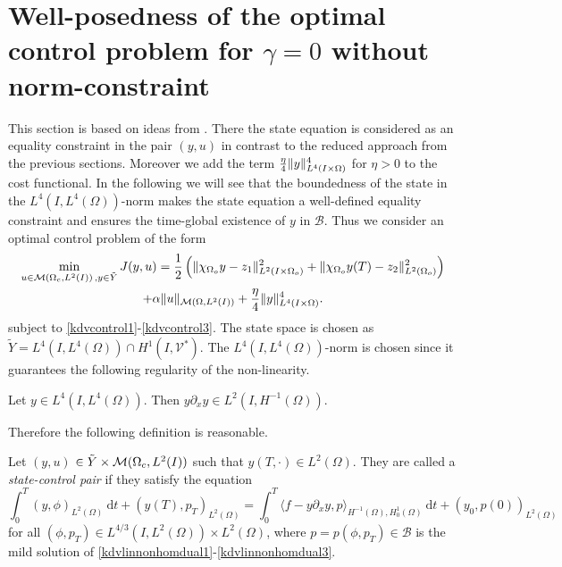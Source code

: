 \section{Well-posedness of the optimal control problem for $\gamma=0$ without norm-constraint}
\label{wp2}
This section is based on ideas from \cite{lions1985control}. There the state equation is considered as an equality constraint in the pair $(y,u)$ in contrast to the reduced approach from the previous sections. Moreover we add the term $\frac{\eta}{4} \lVert y\rVert_{L^4(I\times \Omega)}^4$ for $\eta >0$ to the cost functional. In the following we will see that the boundedness of the state in the $L^4(I,L^4(\Omega))$-norm makes the state equation a well-defined equality constraint and ensures the time-global existence of $y$ in $\mathcal B$. Thus we consider an optimal control problem of the form
\begin{multline}
\min_{u \in \M\,,y\in \tilde Y}J(y,u)=\frac{1}{2}\left(\norm{\chi_{\Omega_{o}}y - z_1}_{L^2(I\times \Omega_{o})}^2+\|\chi_{\Omega_{o}}y(T)-z_2\|_{L^2(\Omega_{o})}^2\right) \\+ \alpha \norm{u}_{\mathcal{M}(\Omega, L^{2}(I))} + \frac{\eta}{4} \norm{y}_{L^4(I\times \Omega)}^4.
\label{cost2}
\end{multline}
subject to \eqref{kdvcontrol1}-\eqref{kdvcontrol3}. The state space is chosen as $\tilde Y = L^4(I,L^4(\Omega))\cap H^1(I,\mathcal V^\ast)$.  The $L^4(I,L^4(\Omega))$-norm is chosen since it guarantees the following regularity of the non-linearity.
\begin{lemma}
\label{lemyyxL4}
 Let $y \in L^4(I,L^4(\Omega))$. Then $y \partial_x y \in L^2(I,H^{-1}(\Omega))$.\\
\end{lemma}
Therefore the following definition is reasonable.
\begin{definition}\label{statecontrolpair}
Let $(y,u)$ $\in \tilde Y\times \mathcal{M}(\Omega_c, L^{2}(I))$ such that $y(T,\cdot)\in L^2(\Omega)$. They are called a \textit{state-control pair} if they satisfy the equation
\begin{equation}\label{weakformkdv L4}
\int_0^T(y,\phi)_{L^2(\Omega)}~\mathrm dt+(y(T),p_T)_{L^2(\Omega)}=\int_0^T\langle f-y\partial_xy,p\rangle_{H^{-1}(\Omega),H^1_0(\Omega)}~\mathrm dt+(y_0,p(0))_{L^2(\Omega)}
\end{equation}
for all $(\phi,p_T) \in L^{4/3}(I,L^2(\Omega))\times L^2(\Omega)$, where $p = p(\phi,p_T)\in \mathcal B$ is the mild solution of \eqref{kdvlinnonhomdual1}-\eqref{kdvlinnonhomdual3}.
\end{definition}\\
